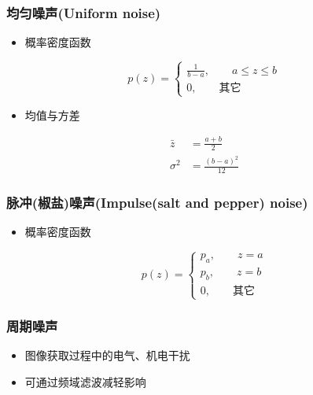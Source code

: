 \documentclass{beamer}
\begin{document}
\begin{frame}
\frametitle{均匀噪声(Uniform noise)}
\label{sec-3-8}

\begin{itemize}
\item 概率密度函数
\end{itemize}
\[ p(z) = 
\begin{cases}
\frac{1}{b-a}, \qquad a\leq z \leq b \\
0, \qquad \text{其它}
\end{cases}
\]
\begin{itemize}
\item 均值与方差
\end{itemize}
\begin{align*}
    \bar z &= \frac{a+b}{2} \\
    \sigma^2 &=  \frac{(b-a)^2}{12}
\end{align*}
\end{frame}
\begin{frame}
\frametitle{脉冲(椒盐)噪声(Impulse(salt and pepper) noise)}
\label{sec-3-9}

\begin{itemize}
\item 概率密度函数
\end{itemize}
\[ p(z) = 
\begin{cases}
p_a, \qquad z=a \\
p_b, \qquad z=b \\
0, \qquad \text{其它}
\end{cases}
\]
\end{frame}
\begin{frame}
\frametitle{周期噪声}
\label{sec-3-10}

\begin{itemize}
\item 图像获取过程中的电气、机电干扰
\item 可通过频域滤波减轻影响
\end{itemize}
\end{frame}
\end{document}
